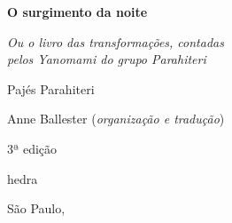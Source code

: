 




\begingroup\thispagestyle{empty}\vspace*{.05\textheight} 

              {\formular
              \huge
              \noindent
              \textbf{O surgimento da noite}\\
              
              \vspace{-0.5cm}
              
              }

              \vspace{0.5cm}

              \noindent{}\textit{Ou o livro das transformações, contadas\\pelos Yanomami do grupo Parahiteri}

             \vspace{1cm}
              
             {\formular\Large
             \noindent{}Pajés Parahiteri}

              \vfill              

              {\small
              \noindent{}Anne Ballester (\textit{organização e tradução})
              }


              \vspace{0.5cm}

              {\small\noindent{}3ª edição}

              \vfill
              
              \newfontfamily{}
              {\noindent\fontsize{30}{40}\selectfont\timesnewroman hedra}

              {\small\timesnewroman\noindent São Paulo, \the\year}

\endgroup
\pagebreak
